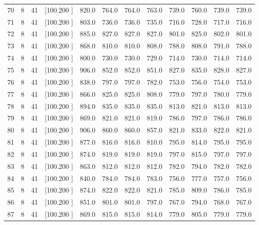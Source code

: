 \documentclass[12pt,a4paper]{article}
\begin{document}
\begin{center}
{\begin{tabular}{r r r r r r r r r r r r}
  70&  8& 41&[100.200   ]&   820.0&   764.0&   764.0&   763.0&   739.0&   760.0&   739.0&   739.0\\[-0.02in]
  71&  8& 41&[100.200   ]&   803.0&   736.0&   736.0&   735.0&   716.0&   728.0&   717.0&   716.0\\[-0.02in]
  72&  8& 41&[100.200   ]&   885.0&   827.0&   827.0&   827.0&   801.0&   825.0&   802.0&   801.0\\[-0.02in]
  73&  8& 41&[100.200   ]&   868.0&   810.0&   810.0&   808.0&   788.0&   808.0&   791.0&   788.0\\[-0.02in]
  74&  8& 41&[100.200   ]&   800.0&   730.0&   730.0&   729.0&   714.0&   730.0&   714.0&   714.0\\[-0.02in]
  75&  8& 41&[100.200   ]&   906.0&   852.0&   852.0&   851.0&   827.0&   835.0&   828.0&   827.0\\[-0.02in]
  76&  8& 41&[100.200   ]&   838.0&   797.0&   797.0&   782.0&   753.0&   756.0&   754.0&   753.0\\[-0.02in]
  77&  8& 41&[100.200   ]&   866.0&   825.0&   825.0&   808.0&   779.0&   797.0&   780.0&   779.0\\[-0.02in]
  78&  8& 41&[100.200   ]&   894.0&   835.0&   835.0&   835.0&   813.0&   821.0&   813.0&   813.0\\[-0.02in]
  79&  8& 41&[100.200   ]&   869.0&   821.0&   821.0&   819.0&   786.0&   797.0&   786.0&   786.0\\[-0.02in]
  80&  8& 41&[100.200   ]&   906.0&   860.0&   860.0&   857.0&   821.0&   833.0&   822.0&   821.0\\[-0.02in]
  81&  8& 41&[100.200   ]&   877.0&   816.0&   816.0&   810.0&   795.0&   814.0&   795.0&   795.0\\[-0.02in]
  82&  8& 41&[100.200   ]&   874.0&   819.0&   819.0&   819.0&   797.0&   815.0&   797.0&   797.0\\[-0.02in]
  83&  8& 41&[100.200   ]&   863.0&   812.0&   812.0&   812.0&   782.0&   794.0&   782.0&   782.0\\[-0.02in]
  84&  8& 41&[100.200   ]&   840.0&   784.0&   784.0&   783.0&   756.0&   777.0&   757.0&   756.0\\[-0.02in]
  85&  8& 41&[100.200   ]&   874.0&   822.0&   822.0&   821.0&   785.0&   809.0&   786.0&   785.0\\[-0.02in]
  86&  8& 41&[100.200   ]&   851.0&   801.0&   801.0&   797.0&   767.0&   794.0&   768.0&   767.0\\[-0.02in]
  87&  8& 41&[100.200   ]&   869.0&   815.0&   815.0&   814.0&   779.0&   805.0&   779.0&   779.0\\[-0.02in]

\end{tabular}}
\end{center}
\end{document}

